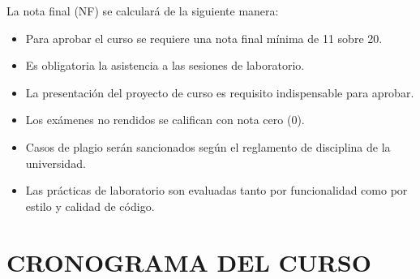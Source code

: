 \documentclass[12pt,a4paper]{article}
\begin{document}
La nota final (NF) se calculará de la siguiente manera:


\begin{tcolorbox}[colback=pucpRojo!5,colframe=pucpRojo,title=\textbf{Políticas de Evaluación}]
\begin{itemize}[leftmargin=*]
    \item Para aprobar el curso se requiere una nota final mínima de 11 sobre 20.
    \item Es obligatoria la asistencia a las sesiones de laboratorio.
    \item La presentación del proyecto de curso es requisito indispensable para aprobar.
    \item Los exámenes no rendidos se califican con nota cero (0).
    \item Casos de plagio serán sancionados según el reglamento de disciplina de la universidad.
    \item Las prácticas de laboratorio son evaluadas tanto por funcionalidad como por estilo y calidad de código.
\end{itemize}
\end{tcolorbox}
\vspace{0.5cm}

\section{CRONOGRAMA DEL CURSO}
\end{document}
